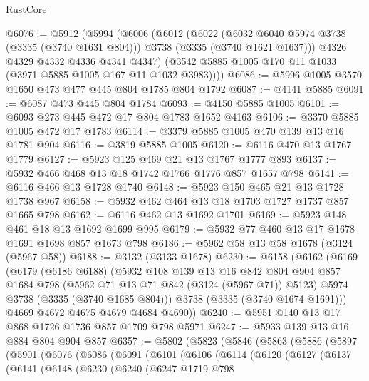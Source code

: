 \begin{lexlean}{RustCore}
\begin{coremodule}
@6076 := @5912
    (@5994
      (@6006
        (@6012
          (@6022
            (@6032 @6040 @5974 @3738 (@3335 (@3740 @1631 @804)))
            @3738
            (@3335 (@3740 @1621 @1637)))
          @4326
          @4329
          @4332
          @4336
          @4341
          @4347)
        (@3542 @5885 @1005 @170 @11 @1033 (@3971 @5885 @1005 @167 @11 @1032 @3983))))
@6086 := @5996 @1005 @3570 @1650 @473 @477 @445 @804 @1785 @804 @1792
@6087 := @4141 @5885
@6091 := @6087 @473 @445 @804 @1784
@6093 := @4150 @5885 @1005
@6101 := @6093 @273 @445 @472 @17 @804 @1783 @1652 @4163
@6106 := @3370 @5885 @1005 @472 @17 @1783
@6114 := @3379 @5885 @1005 @470 @139 @13 @16 @1781 @904
@6116 := @3819 @5885 @1005
@6120 := @6116 @470 @13 @1767 @1779
@6127 := @5923 @125 @469 @21 @13 @1767 @1777 @893
@6137 := @5932 @466 @468 @13 @18 @1742 @1766 @1776 @857 @1657 @798
@6141 := @6116 @466 @13 @1728 @1740
@6148 := @5923 @150 @465 @21 @13 @1728 @1738 @967
@6158 := @5932 @462 @464 @13 @18 @1703 @1727 @1737 @857 @1665 @798
@6162 := @6116 @462 @13 @1692 @1701
@6169 := @5923 @148 @461 @18 @13 @1692 @1699 @995
@6179 := @5932 @77 @460 @13 @17 @1678 @1691 @1698 @857 @1673 @798
@6186 := @5962 @58 @13 @58 @1678 (@3124 (@5967 @58))
@6188 := @3132 (@3133 @1678)
@6230 := @6158
    (@6162
      (@6169
        (@6179
          (@6186 @6188)
          (@5932
            @108
            @139
            @13
            @16
            @842
            @804
            @904
            @857
            @1684
            @798
            (@5962 @71 @13 @71 @842 (@3124 (@5967 @71)) @5123)
            @5974
            @3738
            (@3335 (@3740 @1685 @804)))
          @3738
          (@3335 (@3740 @1674 @1691)))
        @4669
        @4672
        @4675
        @4679
        @4684
        @4690))
@6240 := @5951 @140 @13 @17 @868 @1726 @1736 @857 @1709 @798 @5971
@6247 := @5933 @139 @13 @16 @884 @804 @904 @857
@6357 := @5802
    (@5823
      (@5846
        (@5863
          (@5886
            (@5897
              (@5901
                (@6076
                  (@6086
                    (@6091
                      (@6101
                        (@6106
                          (@6114
                            (@6120
                              (@6127
                                (@6137
                                  (@6141
                                    (@6148
                                      (@6230
                                        (@6240
                                          (@6247
                                            @1719
                                            @798

\end{coremodule}
\end{lexlean}
